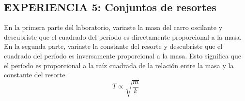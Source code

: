 \documentclass[9pt,a4paper,twocolumn,twoside]{tau-class/tau}
\begin{document}
\subsection{EXPERIENCIA 5: Conjuntos de resortes}
 En  la  primera  parte  del  laboratorio,  variaste  la  masa  del  carro  oscilante  y  descubriste  que  el  cuadrado  del  período  es  directamente  
proporcional  a  la  masa.  En  la  segunda  parte,  variaste  la  constante  del  resorte  y  descubriste  que  el  cuadrado  del  período  es  inversamente   proporcional  a  la  masa.  Esto  significa  que  el  período  es  proporcional  a  la  raíz  cuadrada  de  la  relación  entre  la  masa  y  la  constante  del  resorte.
\begin{equation}
    T\propto\sqrt{\frac{m}{k}}
    \label{eq:periodo_prop}
\end{equation}
\end{document}
